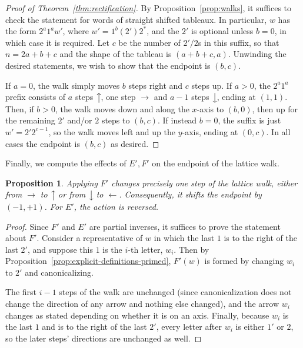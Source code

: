 \documentclass[10pt]{amsart}
\newtheorem{prop}[theorem]{Proposition}
\theoremstyle{definition}
\newcommand{\east}[1]{\ensuremath{\xrightarrow{\ #1\ }}}
\newcommand{\west}[1]{\ensuremath{\xleftarrow{\ #1\ }}}
\newcommand{\north}[1]{\ensuremath{\big \uparrow \!\text{\raisebox{.1ex}{\scriptsize $#1$}}}}
\newcommand{\south}[1]{\ensuremath{\big \downarrow \!\text{\raisebox{.1ex}{\scriptsize $#1$}}}}
\begin{document}
\begin{proof}[Proof of Theorem~\ref{thm:rectification}]
By Proposition~\ref{prop:walks}, it suffices to check the statement for words of straight shifted tableaux. In particular, $w$ has the form $2^a 1^a w'$, where $w' = 1^b (2')2^*$, and the $2'$ is optional unless $b=0$, in which case it is required. Let $c$ be the number of $2'/2$s in this suffix, so that $n = 2a + b + c$ and the shape of the tableau is $(a+b+c,a)$. Unwinding the desired statements, we wish to show that the endpoint is $(b,c)$.

If $a=0$, the walk simply moves $b$ steps right and $c$ steps up. If $a>0$, the $2^a1^a$ prefix consists of $a$ steps $\north{}$, one step $\east{}$ and $a-1$ steps $\south{}$, ending at $(1,1)$. Then, if $b>0$, the walk moves down and along the $x$-axis to $(b,0)$, then up for the remaining $2'$ and/or $2$ steps to $(b,c)$. If instead $b=0$, the suffix is just $w' = 2'2^{c-1}$, so the walk moves left and up the $y$-axis, ending at $(0,c)$. In all cases the endpoint is $(b,c)$ as desired.
\end{proof}

Finally, we compute the effects of $E',F'$ on the endpoint of the lattice walk.

\begin{prop} \label{prop:primed-lattice-endpoint}
Applying $F'$ changes precisely one step of the lattice walk, either from $\east{}$ to $\north{}$ or from $\south{}$ to $\west{}$. Consequently, it shifts the endpoint by $(-1,+1)$. For $E'$, the action is reversed.
\end{prop}

\begin{proof}
Since $F'$ and $E'$ are partial inverses, it suffices to prove the statement about $F'$. Consider a representative of $w$ in which the last $1$ is to the right of the last $2'$, and suppose this $1$ is the $i$-th letter, $w_i$. Then by Proposition~\ref{prop:explicit-definitions-primed}, $F'(w)$ is formed by changing $w_i$ to $2'$ and canonicalizing. 

The first $i-1$ steps of the walk are unchanged (since canonicalization does not change the direction of any arrow and nothing else changed), and the arrow $w_i$ changes as stated depending on whether it is on an axis. Finally, because $w_i$ is the last $1$ and is to the right of the last $2'$, every letter after $w_i$ is either $1'$ or $2$, so the later steps' directions are unchanged as well.
\end{proof}
\end{document}
